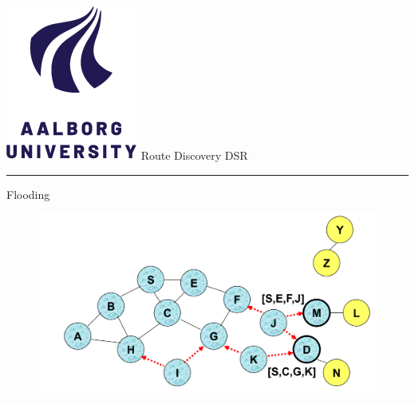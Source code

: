 \documentclass[aspectratio=1610,17pt,utf8]{beamer}
\newcommand{\regularframe}[1]{\color{black}\includegraphics[width=.05\textwidth]{figures/aau.png} #1\\\hrule}
\begin{document}
\begin{frame}{\regularframe{Route Discovery DSR}}
    Flooding\\
    \begin{figure}
        \includegraphics[width=.9\textwidth]{figures/route-discovery.png}
    \end{figure}
\end{frame}
\end{document}

